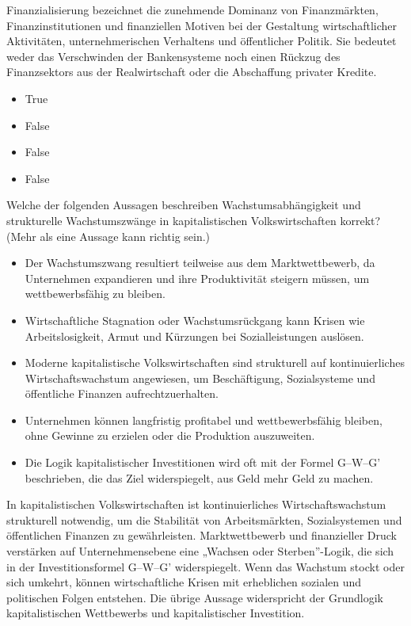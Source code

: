\documentclass[
  nswissgerman,
  a4paper,
  DIV=11,
  numbers=noendperiod,
  oneside,
  openany]{scrreprt}
\providecommand{\tightlist}{%
  \setlength{\itemsep}{0pt}\setlength{\parskip}{0pt}}
\begin{document}
Finanzialisierung bezeichnet die zunehmende Dominanz von Finanzmärkten,
Finanzinstitutionen und finanziellen Motiven bei der Gestaltung
wirtschaftlicher Aktivitäten, unternehmerischen Verhaltens und
öffentlicher Politik. Sie bedeutet weder das Verschwinden der
Bankensysteme noch einen Rückzug des Finanzsektors aus der
Realwirtschaft oder die Abschaffung privater Kredite.

\begin{itemize}
\tightlist
\item
  True
\item
  False
\item
  False
\item
  False
\end{itemize}

Welche der folgenden Aussagen beschreiben Wachstumsabhängigkeit und
strukturelle Wachstumszwänge in kapitalistischen Volkswirtschaften
korrekt? (Mehr als eine Aussage kann richtig sein.)

\begin{itemize}
\tightlist
\item[$\square$]
  Der Wachstumszwang resultiert teilweise aus dem Marktwettbewerb, da
  Unternehmen expandieren und ihre Produktivität steigern müssen, um
  wettbewerbsfähig zu bleiben.
\item[$\square$]
  Wirtschaftliche Stagnation oder Wachstumsrückgang kann Krisen wie
  Arbeitslosigkeit, Armut und Kürzungen bei Sozialleistungen auslösen.
\item[$\square$]
  Moderne kapitalistische Volkswirtschaften sind strukturell auf
  kontinuierliches Wirtschaftswachstum angewiesen, um Beschäftigung,
  Sozialsysteme und öffentliche Finanzen aufrechtzuerhalten.
\item[$\square$]
  Unternehmen können langfristig profitabel und wettbewerbsfähig
  bleiben, ohne Gewinne zu erzielen oder die Produktion auszuweiten.
\item[$\square$]
  Die Logik kapitalistischer Investitionen wird oft mit der Formel
  G--W--G' beschrieben, die das Ziel widerspiegelt, aus Geld mehr Geld
  zu machen.
\end{itemize}

In kapitalistischen Volkswirtschaften ist kontinuierliches
Wirtschaftswachstum strukturell notwendig, um die Stabilität von
Arbeitsmärkten, Sozialsystemen und öffentlichen Finanzen zu
gewährleisten. Marktwettbewerb und finanzieller Druck verstärken auf
Unternehmensebene eine „Wachsen oder Sterben''-Logik, die sich in der
Investitionsformel G--W--G' widerspiegelt. Wenn das Wachstum stockt oder
sich umkehrt, können wirtschaftliche Krisen mit erheblichen sozialen und
politischen Folgen entstehen. Die übrige Aussage widerspricht der
Grundlogik kapitalistischen Wettbewerbs und kapitalistischer
Investition.
\end{document}
